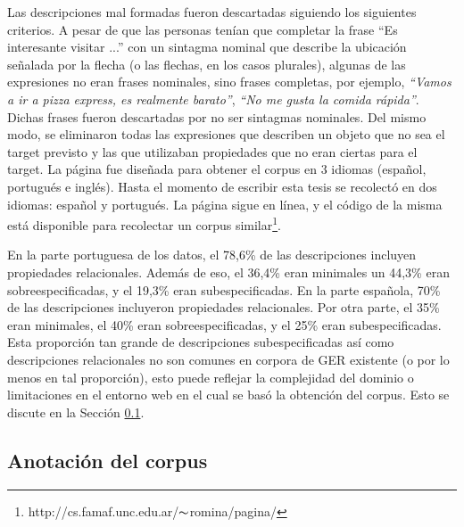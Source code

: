 Las descripciones mal formadas fueron descartadas siguiendo los siguientes criterios. A pesar de que las personas ten\'{i}an que completar la frase ``Es interesante visitar ...'' con un sintagma nominal que describe la ubicaci\'on se\~nalada por la flecha (o las flechas, en los casos plurales), algunas de las expresiones no eran frases nominales, sino frases completas, por ejemplo, \emph{``Vamos a ir a pizza express, es realmente barato''}, \emph{``No me gusta la comida r\'apida''}. Dichas frases fueron descartadas por no ser sintagmas nominales. Del mismo modo, se eliminaron todas las expresiones que describen un objeto que no sea el target previsto y las que utilizaban propiedades que no eran ciertas para el target. La p\'agina fue dise\~nada para obtener el corpus en 3 idiomas (espa\~nol, portugu\'es e ingl\'es). Hasta el momento de escribir esta tesis se recolect\'o en dos idiomas: espa\~nol y portugu\'es. La p\'agina sigue en l\'inea, y el c\'odigo de la misma est\'a disponible para recolectar un corpus similar\footnote{http://cs.famaf.unc.edu.ar/$\thicksim$romina/pagina/}.


En la parte portuguesa de los datos, el 78,6\% de las descripciones incluyen propiedades relacionales. Adem\'as de eso, el 36,4\% eran minimales un 44,3\% eran sobreespecificadas, y el 19,3\% eran subespecificadas. En la parte espa\~nola, 70\% de las descripciones incluyeron propiedades relacionales. Por otra parte, el 35\% eran minimales, el 40\% eran sobreespecificadas, y el 25\% eran subespecificadas.
Esta proporci\'on tan grande de descripciones subespecificadas as\'{i} como descripciones relacionales no son comunes en corpora de GER existente (o por lo menos en tal proporci\'on), esto puede reflejar la complejidad del dominio o limitaciones en el entorno web en el cual se bas\'o la obtenci\'on del corpus. Esto se discute en la Secci\'on \ref{corpus-anotacion}.



\subsection{Anotaci\'on del corpus}
\label{corpus-anotacion}


